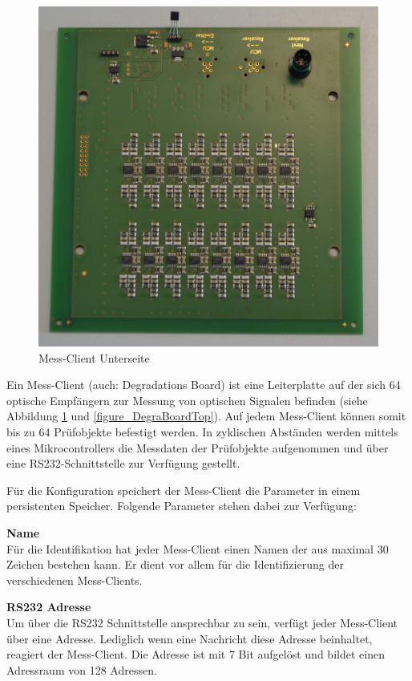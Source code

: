 \begin{figure}[H]
  \includegraphics[width=\linewidth]{img/general/DegraBoardBottom.jpg}
  \caption{Mess-Client Unterseite}\label{figure_DegraBoardBottom}
\endminipage
\end{figure}

Ein Mess-Client (auch: Degradations Board) ist eine Leiterplatte auf der sich 64 optische Empfängern zur Messung von optischen Signalen befinden (siehe Abbildung \ref{figure_DegraBoardBottom} und \ref{figure_DegraBoardTop}). Auf jedem Mess-Client können somit bis zu 64 Prüfobjekte befestigt werden. In zyklischen Abständen werden mittels eines Mikrocontrollers die Messdaten der Prüfobjekte aufgenommen und über eine RS232-Schnittstelle zur Verfügung gestellt.\ 

Für die Konfiguration speichert der Mess-Client die Parameter in einem persistenten Speicher. Folgende Parameter stehen dabei zur Verfügung:

\textbf{Name}\\
Für die Identifikation hat jeder Mess-Client einen Namen der aus maximal 30 Zeichen bestehen kann. Er dient vor allem für die Identifizierung der verschiedenen Mess-Clients.\ 

\textbf{RS232 Adresse}\\
Um über die RS232 Schnittstelle ansprechbar zu sein, verfügt jeder Mess-Client über eine Adresse. Lediglich wenn eine Nachricht diese Adresse beinhaltet, reagiert der Mess-Client. Die Adresse ist mit 7 Bit aufgelöst und bildet einen Adressraum von 128 Adressen.\ 

